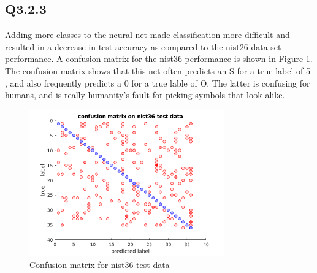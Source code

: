 \documentclass[12pt]{article}
\begin{document}
\subsection{Q3.2.3}
Adding more classes to the neural net made classification more difficult and resulted in a decrease in test accuracy as compared to the nist26 data set performance. A confusion matrix for the nist36 performance is shown in Figure \ref{fig:nist36confusion}. The confusion matrix shows that this net often predicts an S for a true label of 5 , and also frequently predicts a 0 for a true lable of O. The latter is confusing for humans, and is really humanity's fault for picking symbols that look alike.
\begin{figure}[H]
\centering
\includegraphics[page=1,width=0.75\textwidth]{q323confusion}
\caption{ Confusion matrix for nist36 test data } 
\label{fig:nist36confusion}
\end{figure}   
\end{document}
